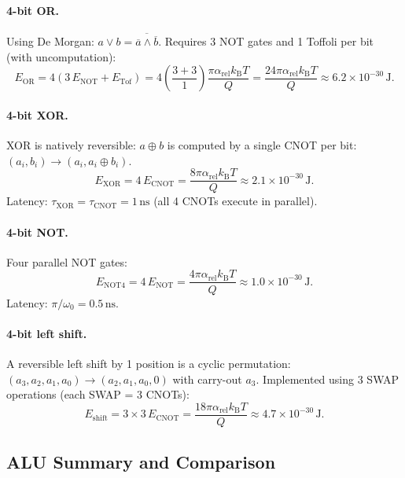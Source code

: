 \documentclass[11pt,twocolumn]{article}
\theoremstyle{definition}
\theoremstyle{remark}
\newcommand{\kB}{k_{\mathrm{B}}}
\begin{document}
\paragraph{4-bit OR.}
Using De Morgan: $a \vee b = \overline{\overline{a} \wedge
\overline{b}}$. Requires 3 NOT gates and 1 Toffoli per bit (with
uncomputation):
\begin{equation}
E_{\mathrm{OR}} = 4(3\,E_{\mathrm{NOT}} + E_{\mathrm{Tof}})
= 4\left(\frac{3 + 3}{1}\right)\frac{\pi\alpha_{\mathrm{rel}}\kB T}{Q}
= \frac{24\pi\alpha_{\mathrm{rel}}\kB T}{Q}
\approx 6.2\times 10^{-30}\,\mathrm{J}.
\end{equation}

\paragraph{4-bit XOR.}
XOR is natively reversible: $a \oplus b$ is computed by a single CNOT
per bit: $(a_i, b_i) \to (a_i, a_i \oplus b_i)$.
\begin{equation}
E_{\mathrm{XOR}} = 4\,E_{\mathrm{CNOT}} = \frac{8\pi\alpha_{\mathrm{rel}}\kB T}{Q}
\approx 2.1\times 10^{-30}\,\mathrm{J}.
\end{equation}
Latency: $\tau_{\mathrm{XOR}} = \tau_{\mathrm{CNOT}} = 1\,\mathrm{ns}$
(all 4 CNOTs execute in parallel).

\paragraph{4-bit NOT.}
Four parallel NOT gates:
\begin{equation}
E_{\mathrm{NOT4}} = 4\,E_{\mathrm{NOT}} = \frac{4\pi\alpha_{\mathrm{rel}}\kB T}{Q}
\approx 1.0\times 10^{-30}\,\mathrm{J}.
\end{equation}
Latency: $\pi/\omega_0 = 0.5\,\mathrm{ns}$.

\paragraph{4-bit left shift.}
A reversible left shift by 1 position is a cyclic permutation:
$(a_3, a_2, a_1, a_0) \to (a_2, a_1, a_0, 0)$ with carry-out $a_3$.
Implemented using 3 SWAP operations (each SWAP = 3 CNOTs):
\begin{equation}
E_{\mathrm{shift}} = 3 \times 3\,E_{\mathrm{CNOT}} = \frac{18\pi\alpha_{\mathrm{rel}}\kB T}{Q}
\approx 4.7\times 10^{-30}\,\mathrm{J}.
\end{equation}

\subsection{ALU Summary and Comparison}\label{sec:alu_comparison}
\end{document}
